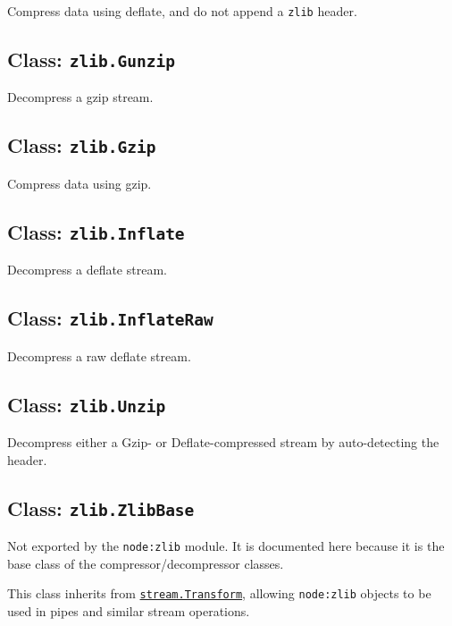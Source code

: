 Compress data using deflate, and do not append a \texttt{zlib} header.

\subsection{\texorpdfstring{Class:
\texttt{zlib.Gunzip}}{Class: zlib.Gunzip}}\label{class-zlib.gunzip}

Decompress a gzip stream.

\subsection{\texorpdfstring{Class:
\texttt{zlib.Gzip}}{Class: zlib.Gzip}}\label{class-zlib.gzip}

Compress data using gzip.

\subsection{\texorpdfstring{Class:
\texttt{zlib.Inflate}}{Class: zlib.Inflate}}\label{class-zlib.inflate}

Decompress a deflate stream.

\subsection{\texorpdfstring{Class:
\texttt{zlib.InflateRaw}}{Class: zlib.InflateRaw}}\label{class-zlib.inflateraw}

Decompress a raw deflate stream.

\subsection{\texorpdfstring{Class:
\texttt{zlib.Unzip}}{Class: zlib.Unzip}}\label{class-zlib.unzip}

Decompress either a Gzip- or Deflate-compressed stream by auto-detecting
the header.

\subsection{\texorpdfstring{Class:
\texttt{zlib.ZlibBase}}{Class: zlib.ZlibBase}}\label{class-zlib.zlibbase}

Not exported by the \texttt{node:zlib} module. It is documented here
because it is the base class of the compressor/decompressor classes.

This class inherits from
\href{stream.md\#class-streamtransform}{\texttt{stream.Transform}},
allowing \texttt{node:zlib} objects to be used in pipes and similar
stream operations.


